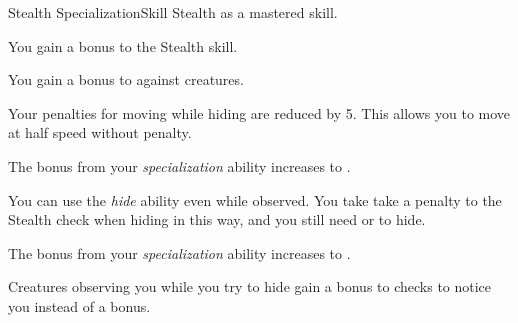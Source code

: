     \begin{feat}{Stealth Specialization}{Skill}
        \featpre Stealth as a mastered skill.

         You gain a  bonus to the Stealth skill.

         You gain a  bonus to  against  creatures.

         Your penalties for moving while hiding are reduced by 5.
        This allows you to move at half speed without penalty.

         The bonus from your \textit{specialization} ability increases to .

         You can use the \textit{hide} ability even while observed.
        You take take a  penalty to the Stealth check when hiding in this way, and you still need  or  to hide.

         The bonus from your \textit{specialization} ability increases to .

         Creatures observing you while you try to hide gain a  bonus to checks to notice you instead of a  bonus.
    \end{feat}

